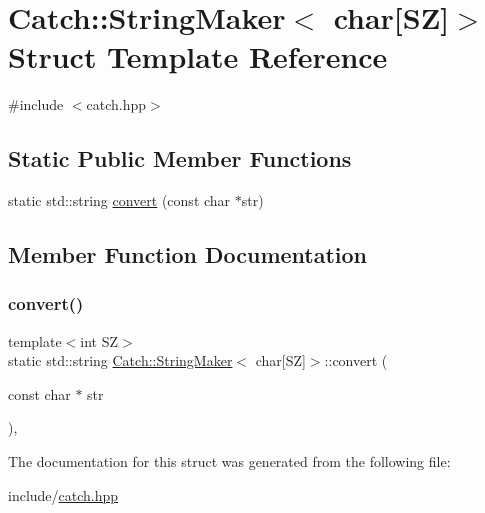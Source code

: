 \hypertarget{structCatch_1_1StringMaker_3_01char[SZ]_4}{}\section{Catch\+:\+:String\+Maker$<$ char\mbox{[}SZ\mbox{]}$>$ Struct Template Reference}
\label{structCatch_1_1StringMaker_3_01char[SZ]_4}


{\ttfamily \#include $<$catch.\+hpp$>$}

\subsection*{Static Public Member Functions}
\begin{DoxyCompactItemize}
\item 
static std\+::string \mbox{\hyperlink{structCatch_1_1StringMaker_3_01char[SZ]_4_ab4938ae9fbc5e01cf6a3be615519cefd}{convert}} (const char $\ast$str)
\end{DoxyCompactItemize}


\subsection{Member Function Documentation}
\mbox{\label{structCatch_1_1StringMaker_3_01char[SZ]_4_ab4938ae9fbc5e01cf6a3be615519cefd}} 
\subsubsection{\texorpdfstring{convert()}{convert()}}
{\footnotesize\ttfamily template$<$int SZ$>$ \\
static std\+::string \mbox{\hyperlink{structCatch_1_1StringMaker}{Catch\+::\+String\+Maker}}$<$ char\mbox{[}SZ\mbox{]}$>$\+::convert (\begin{DoxyParamCaption}\item[{const char $\ast$}]{str }\end{DoxyParamCaption})\hspace{0.3cm}{\ttfamily [inline]}, {\ttfamily [static]}}



The documentation for this struct was generated from the following file\+:\begin{DoxyCompactItemize}
\item 
include/\mbox{\hyperlink{catch_8hpp}{catch.\+hpp}}\end{DoxyCompactItemize}
